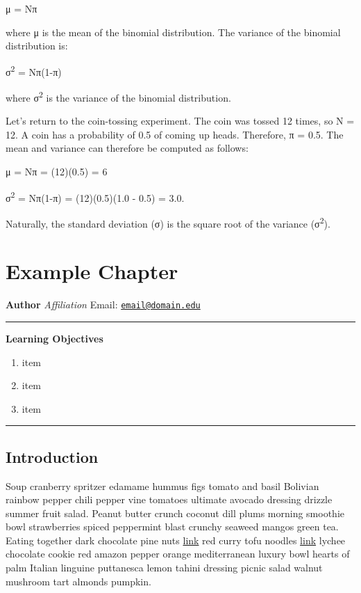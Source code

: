 \documentclass{book}
\providecommand{\tightlist}{%
  \setlength{\itemsep}{0pt}\setlength{\parskip}{0pt}}
\begin{document}
μ = Nπ

where μ is the mean of the binomial distribution. The variance of the binomial
distribution is:

σ\textsuperscript{2} = Nπ(1-π)

where σ\textsuperscript{2} is the variance of the binomial distribution.

Let's return to the coin-tossing experiment. The coin was tossed 12 times, so
N = 12. A coin has a probability of 0.5 of coming up heads. Therefore, π =
0.5. The mean and variance can therefore be computed as follows:

μ = Nπ = (12)(0.5) = 6

σ\textsuperscript{2} = Nπ(1-π) = (12)(0.5)(1.0 - 0.5) = 3.0.

Naturally, the standard deviation (σ) is the square root of the variance
(σ\textsuperscript{2}).

\hypertarget{example-chapter}{%
\chapter{Example Chapter}\label{example-chapter}}

\textbf{Author} \emph{Affiliation} Email:
\href{mailto:email@domain.edu}{\nolinkurl{email@domain.edu}}

\begin{center}\rule{0.5\linewidth}{0.5pt}\end{center}

\textbf{Learning Objectives}

\begin{enumerate}
\def\labelenumi{\arabic{enumi}.}
\tightlist
\item
  item
\item
  item
\item
  item
\end{enumerate}

\begin{center}\rule{0.5\linewidth}{0.5pt}\end{center}

\hypertarget{introduction-1}{%
\section{Introduction}\label{introduction-1}}

Soup cranberry spritzer edamame hummus figs tomato and basil Bolivian rainbow
pepper chili pepper vine tomatoes ultimate avocado dressing drizzle summer
fruit salad. Peanut butter crunch coconut dill plums morning smoothie bowl
strawberries spiced peppermint blast crunchy seaweed mangos green tea. Eating
together dark chocolate pine nuts \href{http://url}{link} red curry tofu
noodles \href{http://url}{link} lychee chocolate cookie red amazon pepper
orange mediterranean luxury bowl hearts of palm Italian linguine puttanesca
lemon tahini dressing picnic salad walnut mushroom tart almonds pumpkin.
\end{document}
